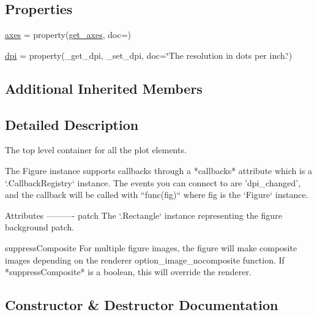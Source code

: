 \subsection*{Properties}
\begin{DoxyCompactItemize}
\item 
\hyperlink{classmatplotlib_1_1figure_1_1Figure_a222f605f561ab5468751dbbc67e84597}{axes} = property(\hyperlink{classmatplotlib_1_1figure_1_1Figure_a6367e68d3e0650e547b94b364ea07961}{get\+\_\+axes}, doc=)
\item 
\hyperlink{classmatplotlib_1_1figure_1_1Figure_aec13143c0425f2f9b5e40bd6cfda42dc}{dpi} = property(\+\_\+get\+\_\+dpi, \+\_\+set\+\_\+dpi, doc=\char`\"{}The resolution in dots per inch.\char`\"{})
\end{DoxyCompactItemize}
\subsection*{Additional Inherited Members}


\subsection{Detailed Description}
\begin{DoxyVerb}The top level container for all the plot elements.

The Figure instance supports callbacks through a *callbacks* attribute
which is a `.CallbackRegistry` instance.  The events you can connect to
are 'dpi_changed', and the callback will be called with ``func(fig)`` where
fig is the `Figure` instance.

Attributes
----------
patch
    The `.Rectangle` instance representing the figure background patch.

suppressComposite
    For multiple figure images, the figure will make composite images
    depending on the renderer option_image_nocomposite function.  If
    *suppressComposite* is a boolean, this will override the renderer.
\end{DoxyVerb}
 

\subsection{Constructor \& Destructor Documentation}
\mbox{\label{classmatplotlib_1_1figure_1_1Figure_a381d78fa4db0a667be45e78501710fee}} 
